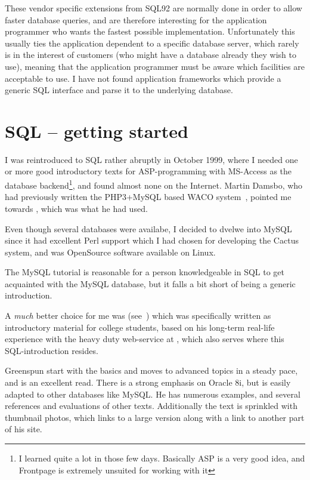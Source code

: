 These vendor specific extensions from SQL92 are normally done in order
to allow faster database queries, and are therefore interesting for
the application programmer who wants the fastest possible
implementation.  Unfortunately this usually ties the application
dependent to a specific database server, which rarely is in the
interest of customers (who might have a database already they wish to
use), meaning that the application programmer must be aware which
facilities are acceptable to use.  I have not found application
frameworks which provide a generic SQL interface and parse it to the
underlying database.


\section{SQL -- getting started}
\label{sec:sql-getting-started}

I was reintroduced to SQL rather abruptly in October 1999, where I
needed one or more good introductory texts for ASP-programming with
MS-Access as the database backend\footnote{I learned quite a lot in
  those few days.  Basically ASP is a very good idea, and Frontpage is
  extremely unsuited for working with it}, and found almost none on
the Internet.  Martin Damsbo, who had previously written the
PHP3+MySQL based WACO system~\cite{mez-waco}, pointed me towards
, which was what he had used.

Even though several databases were availabe, I decided to dvelwe into
MySQL since it had excellent Perl support which I had chosen for
developing the Cactus system,
and was OpenSource software available on Linux.

The MySQL tutorial is reasonable for a person knowledgeable in SQL to
get acquainted with the MySQL database, but it falls a bit short of
being a generic introduction.


A \textit{much} better choice for me was
(see~\cite{greenspun:sql-for-web-nerds}) which was specifically written as
introductory material for college students, based on his long-term
real-life experience with the heavy duty web-service at
, which also serves
 where this SQL-introduction
resides.

Greenspun start with the basics and moves to advanced
topics in a steady pace, and is an excellent read.  There is a strong
emphasis on Oracle 8i, but is easily adapted to other databases like
MySQL.  He has numerous examples, and several references and
evaluations of other texts.  Additionally the text is sprinkled with
thumbnail photos, which links to a large version along with a link to
another part of his site.

